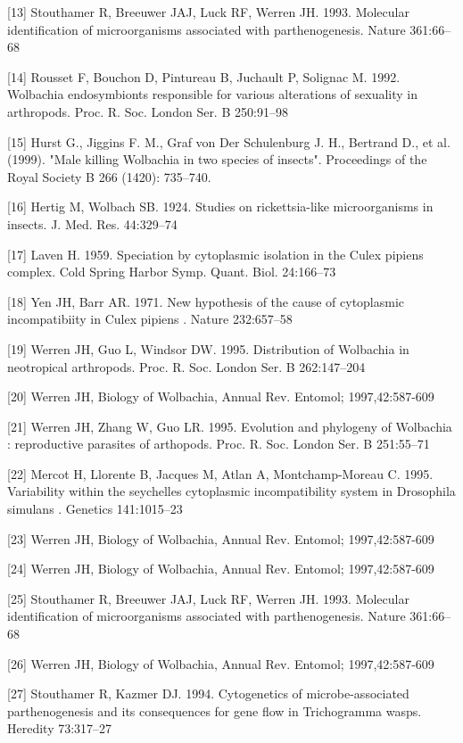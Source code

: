 \documentclass[twocolumn]{article}
\begin{document}
[13] Stouthamer R, Breeuwer JAJ, Luck RF, Werren JH. 1993. Molecular identification of microorganisms associated with parthenogenesis. Nature 361:66–68 

[14] Rousset F, Bouchon D, Pintureau B, Juchault P, Solignac M. 1992. Wolbachia endosymbionts responsible for various alterations of sexuality in arthropods. Proc. R. Soc. London Ser. B 250:91–98

[15] Hurst G., Jiggins F. M., Graf von Der Schulenburg J. H., Bertrand D., et al. (1999). "Male killing Wolbachia in two species of insects". Proceedings of the Royal Society B 266 (1420): 735–740.  

[16] Hertig M, Wolbach SB. 1924. Studies on rickettsia-like microorganisms in insects. J. Med. Res. 44:329–74

[17] Laven H. 1959. Speciation by cytoplasmic isolation in the Culex pipiens complex. Cold Spring Harbor Symp. Quant. Biol. 24:166–73

[18] Yen JH, Barr AR. 1971. New hypothesis of the cause of cytoplasmic incompatibiity in Culex pipiens . Nature 232:657–58

[19] Werren JH, Guo L, Windsor DW. 1995. Distribution of Wolbachia in neotropical arthropods. Proc. R. Soc. London Ser. B 262:147–204

[20] Werren JH, Biology of Wolbachia, Annual Rev. Entomol; 1997,42:587-609

[21] Werren JH, Zhang W, Guo LR. 1995. Evolution and phylogeny of Wolbachia : reproductive parasites of arthopods. Proc. R. Soc. London Ser. B 251:55–71 

[22] Mercot H, Llorente B, Jacques M, Atlan A, Montchamp-Moreau C. 1995. Variability within the seychelles cytoplasmic incompatibility system in Drosophila simulans . Genetics 141:1015–23

[23] Werren JH, Biology of Wolbachia, Annual Rev. Entomol; 1997,42:587-609

[24] Werren JH, Biology of Wolbachia, Annual Rev. Entomol; 1997,42:587-609

[25] Stouthamer R, Breeuwer JAJ, Luck RF, Werren JH. 1993. Molecular identification of microorganisms associated with parthenogenesis. Nature 361:66–68

[26] Werren JH, Biology of Wolbachia, Annual Rev. Entomol; 1997,42:587-609

[27] Stouthamer R, Kazmer DJ. 1994. Cytogenetics of microbe-associated parthenogenesis and its consequences for gene flow in Trichogramma wasps. Heredity 73:317–27 
\end{document}
